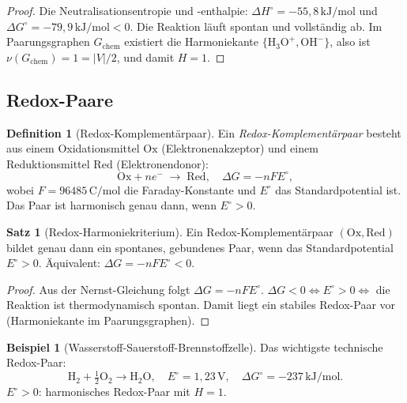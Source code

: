 ﻿\documentclass[a4paper,12pt]{article}
\theoremstyle{definition}
\newtheorem{definition}{Definition}
\newtheorem{beispiel}{Beispiel}
\newtheorem{satz}{Satz}
\begin{document}
\begin{proof}
	Die Neutralisationsentropie und -enthalpie: $\Delta H^\circ = -55{,}8\,\mathrm{kJ/mol}$
	und $\Delta G^\circ = -79{,}9\,\mathrm{kJ/mol} < 0$.
	Die Reaktion läuft spontan und vollständig ab. Im Paarungsgraphen $G_{\mathrm{chem}}$
	existiert die Harmoniekante $\{\mathrm{H_3O}^+, \mathrm{OH}^-\}$, also ist
	$\nu(G_{\mathrm{chem}}) = 1 = |V|/2$, und damit $H = 1$.
\end{proof}

\subsection{Redox-Paare}

\begin{definition}[Redox-Komplementärpaar]
	Ein \emph{Redox-Komplementärpaar} besteht aus einem Oxidationsmittel
	$\mathrm{Ox}$ (Elektronenakzeptor) und einem Reduktionsmittel $\mathrm{Red}$
	(Elektronendonor):
	\[
		\mathrm{Ox} + n e^- \;\longrightarrow\; \mathrm{Red}, \quad
		\Delta G = -n F E^\circ,
	\]
	wobei $F = 96485\,\mathrm{C/mol}$ die Faraday-Konstante und $E^\circ$ das
	Standardpotential ist. Das Paar ist harmonisch genau dann, wenn $E^\circ > 0$.
\end{definition}

\begin{satz}[Redox-Harmoniekriterium]
	\label{satz:redox}
	Ein Redox-Komplementärpaar $(\mathrm{Ox}, \mathrm{Red})$ bildet genau dann ein
	spontanes, gebundenes Paar, wenn das Standardpotential $E^\circ > 0$.
	Äquivalent: $\Delta G = -nFE^\circ < 0$.
\end{satz}

\begin{proof}
	Aus der Nernst-Gleichung folgt $\Delta G = -nFE^\circ$.
	$\Delta G < 0 \Leftrightarrow E^\circ > 0 \Leftrightarrow$
	die Reaktion ist thermodynamisch spontan.
	Damit liegt ein stabiles Redox-Paar vor (Harmoniekante im Paarungsgraphen).
\end{proof}

\begin{beispiel}[Wasserstoff-Sauerstoff-Brennstoffzelle]
	Das wichtigste technische Redox-Paar:
	\[
		\mathrm{H_2} + \tfrac{1}{2}\mathrm{O_2} \longrightarrow \mathrm{H_2O},
		\quad E^\circ = 1{,}23\,\mathrm{V},\quad \Delta G^\circ = -237\,\mathrm{kJ/mol}.
	\]
	$E^\circ > 0$: harmonisches Redox-Paar mit $H = 1$.
\end{beispiel}

\end{document}
